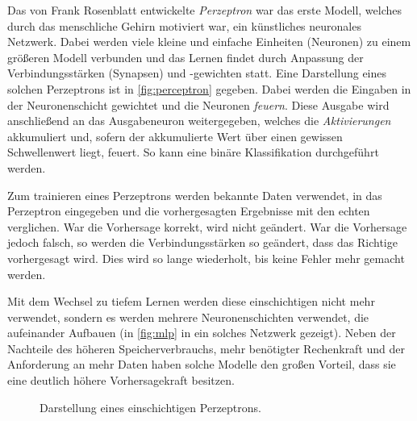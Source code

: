 			Das von Frank Rosenblatt entwickelte \emph{Perzeptron} war das erste Modell, welches durch das menschliche Gehirn motiviert war, ein künstliches neuronales Netzwerk. Dabei werden viele kleine und einfache Einheiten (Neuronen) zu einem größeren Modell verbunden und das Lernen findet durch Anpassung der Verbindungsstärken (Synapsen) und -gewichten statt. Eine Darstellung eines solchen Perzeptrons ist in \autoref{fig:perceptron} gegeben. Dabei werden die Eingaben in der Neuronenschicht gewichtet und die Neuronen \emph{feuern}. Diese Ausgabe wird anschließend an das Ausgabeneuron weitergegeben, welches die \emph{Aktivierungen} akkumuliert und, sofern der akkumulierte Wert über einen gewissen Schwellenwert liegt, feuert. So kann eine binäre Klassifikation durchgeführt werden.

			Zum trainieren eines Perzeptrons werden bekannte Daten verwendet, in das Perzeptron eingegeben und die vorhergesagten Ergebnisse mit den echten verglichen. War die Vorhersage korrekt, wird nicht geändert. War die Vorhersage jedoch falsch, so werden die Verbindungsstärken so geändert, dass das Richtige vorhergesagt wird. Dies wird so lange wiederholt, bis keine Fehler mehr gemacht werden.

			Mit dem Wechsel zu tiefem Lernen werden diese einschichtigen nicht mehr verwendet, sondern es werden mehrere Neuronenschichten verwendet, die aufeinander Aufbauen (in \autoref{fig:mlp} in ein solches Netzwerk gezeigt). Neben der Nachteile des höheren Speicherverbrauchs, mehr benötigter Rechenkraft und der Anforderung an mehr Daten haben solche Modelle den großen Vorteil, dass sie eine deutlich höhere Vorhersagekraft besitzen.

			\begin{figure}
				\centering
				\caption{Darstellung eines einschichtigen Perzeptrons.}
				\label{fig:perceptron}
			\end{figure}

